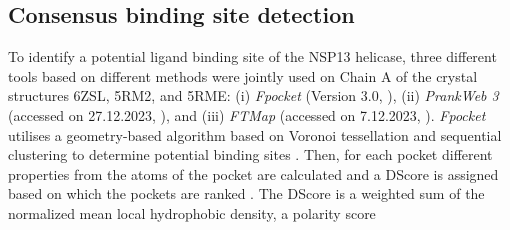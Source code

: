 \documentclass[11pt, letterpaper, titlepage]{article}
\renewcommand{\cite}{\parencite}
\begin{document}
\subsection{Consensus binding site detection}
To identify a potential ligand binding site of the NSP13 helicase, three different tools based on different methods were jointly used on Chain A of the crystal structures 6ZSL, 5RM2, and 5RME: (i) \textit{Fpocket} (Version 3.0, \textcite{package_Fpocket}), (ii) \textit{PrankWeb 3} (accessed on 27.12.2023, \textcite{package_P2Rank, package_PrankWeb, package_PrankWeb3}), and (iii) \textit{FTMap} (accessed on 7.12.2023, \textcite{package_FTMAP}).  
\textit{Fpocket} utilises a geometry-based algorithm based on Voronoi tessellation and sequential clustering to determine potential binding sites \cite{package_Fpocket}. Then, for each pocket different properties from the atoms of the pocket are calculated and a \ac{DScore} is assigned based on which the pockets are ranked \cite{package_Fpocket}. 
The \ac{DScore} is a weighted sum of the normalized mean local hydrophobic density, a polarity score %
\end{document}
